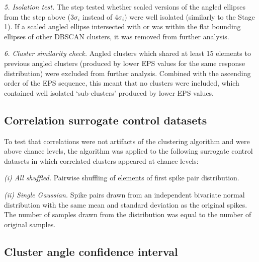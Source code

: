 \documentclass{article}
\begin{document}
\textit{5. Isolation test.} The step tested whether scaled versions of the angled ellipses from the step above ($3\sigma_i$ instead of $4\sigma_i$) were well isolated (similarly to the Stage 1). If a scaled angled ellipse intersected with or was within the flat bounding ellipses of other DBSCAN clusters, it was removed from further analysis.

\textit{6. Cluster similarity check.} Angled clusters which shared at least 15 elements to previous angled clusters (produced by lower EPS values for the same response distribution) were excluded from further analysis. Combined with the ascending order of the EPS sequence, this meant that no clusters were included, which contained well isolated `sub-clusters' produced by lower EPS values.




\subsection{Correlation surrogate control datasets}
\label{methods:correlation_surrogate_control_datasets}

To test that correlations were not artifacts of the clustering algorithm and were above chance levels, the algorithm was applied to the following surrogate control datasets in which correlated clusters appeared at chance levels:

\textit{(i) All shuffled.} Pairwise shuffling of elements of first spike pair distribution.

\textit{(ii) Single Gaussian.} Spike pairs drawn from an independent bivariate normal distribution with the same mean and standard deviation as the original spikes. The number of samples drawn from the distribution was equal to the number of original samples.






\subsection{Cluster angle confidence interval}
\label{methods:cluster_angle_confidence_interval}
\end{document}
